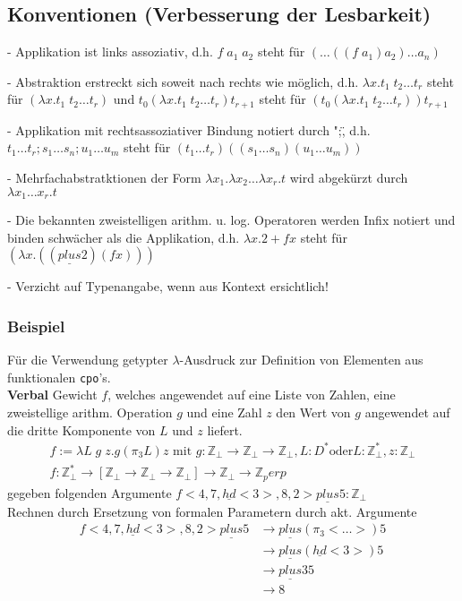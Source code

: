 \subsection{Konventionen (Verbesserung der Lesbarkeit)}
\begin{compactitem}
\item[-] Applikation ist links assoziativ, d.h. $f \; a_1 \; a_2$ steht für $(\dots((f\;a_1)a_2)\dots a_n)$
\item[-] Abstraktion erstreckt sich soweit nach rechts wie möglich, d.h. $\lambda x.t_1 \; t_2 \dots t_r$ steht für $(\lambda x.t_1 \; t_2 \dots t_r)$ und $t_0 (\lambda x.t_1 \; t_2 \dots t_r) t_{r+1}$ steht für $(t_0 (\lambda x. t_1 \; t_2 \dots t_r) ) t_{r+1}$
\item[-] Applikation mit rechtsassoziativer Bindung notiert durch ";\", d.h. $t_1 \dots t_r; s_1 \dots s_n; u_1 \dots u_m$ steht für $(t_1 \dots t_r) ((s_1 \dots s_n)( u_1 \dots u_m))$
\item[-] Mehrfachabstratktionen der Form $\lambda x_1.\lambda x_2 \dots \lambda x_r.t$ wird abgekürzt durch $\lambda x_1 \dots x_r . t$
\item[-] Die bekannten zweistelligen arithm. u. log. Operatoren werden Infix notiert und binden schwächer als die Applikation, d.h. $\lambda x. 2 + f x$ steht für $(\lambda x.((\underline{plus} 2)(f x)))$
\item[-] Verzicht auf Typenangabe, wenn aus Kontext ersichtlich!
\end{compactitem}

\subsubsection*{Beispiel} 
Für die Verwendung getypter $\lambda$-Ausdruck zur Definition von Elementen aus funktionalen \lstinline!cpo!'s.\\
\textbf{Verbal} Gewicht $f$, welches angewendet auf eine Liste von Zahlen, eine zweistellige arithm. Operation $g$ und eine Zahl $z$ den Wert von $g$ angewendet auf die dritte Komponente von $L$ und $z$ liefert.
\begin{align*}
f:=\lambda L\; g \;z . g (\pi_3 L) z \text{ mit } g : \mathbb{Z}_\perp \rightarrow \mathbb{Z}_\perp \rightarrow \mathbb{Z}_\perp, L : D^* \text{oder} L : \mathbb{Z}^*_\perp, z : \mathbb{Z}_\perp\\
f : \mathbb{Z}_\perp^* \rightarrow [\mathbb{Z}_\perp \rightarrow \mathbb{Z}_\perp \rightarrow \mathbb{Z}_\perp] \rightarrow \mathbb{Z}_\perp \rightarrow \mathbb{Z}_perp
\end{align*}
gegeben folgenden Argumente $f <4, 7, \underline{hd}<3>, 8, 2> \underline{plus} 5 : \mathbb{Z}_\perp $ \\
Rechnen durch Ersetzung von formalen Parametern durch akt. Argumente
\begin{align*}
f <4, 7, \underline{hd}<3>, 8, 2> \underline{plus} 5 &\rightarrow \underline{plus} (\pi_3 <\dots>) 5 \\
&\rightarrow \underline{plus} (\underline{hd}<3>) 5 \\
&\rightarrow \underline{plus} 3 5 \\
& \rightarrow 8\\
\end{align*}
